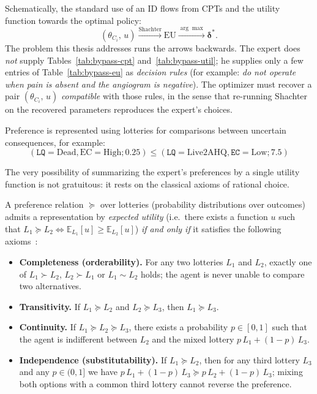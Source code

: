Schematically, the standard use of an ID flows from CPTs and the
utility function towards the optimal policy:
\[
  (\theta_{C_i},\, u) \xrightarrow{\text{Shachter}} \mathrm{EU}
  \xrightarrow{\arg\max} \boldsymbol{\delta}^{\!*}.
\]
The problem this
thesis addresses runs the arrows backwards. The expert does
\emph{not} supply Tables~\ref{tab:bypass-cpt}
and~\ref{tab:bypass-util}; he supplies only a few entries of
Table~\ref{tab:bypass-eu} as \emph{decision rules} (for example:\textit{ do not operate
when pain is absent and the angiogram is negative}). The optimizer
must recover a pair $(\theta_{C_i},\, u)$ \emph{compatible} with
those rules, in the sense that re-running Shachter on the recovered
parameters reproduces the expert's choices.

Preference is represented using lotteries for comparisons between uncertain consequences, for example:
\[
(\texttt{LQ} = \text{Dead}, \text{EC} = \text{High}; 0.25) \leq (\texttt{LQ} = \text{Live2AHQ}, \texttt{EC} = \text{Low}; 7.5)
\]

The very possibility of summarizing the expert's preferences by a
single utility function is not gratuitous: it rests on the classical
axioms of rational choice.



\begin{definition}
\label{def:vnm-axioms}
A preference relation $\succeq$ over lotteries (probability
distributions over outcomes) admits a representation by
\emph{expected utility} (i.e.\ there exists a function $u$ such that
$L_1 \succeq L_2 \iff \mathbb{E}_{L_1}[u] \ge \mathbb{E}_{L_2}[u]$)
\emph{if and only if} it satisfies the following
axioms~\cite{vonneumann1944theory}:
\begin{itemize}
  \item \textbf{Completeness (orderability).} For any two lotteries
        $L_1$ and $L_2$, exactly one of $L_1 \succ L_2$,
        $L_2 \succ L_1$ or $L_1 \sim L_2$ holds; the agent is never
        unable to compare two alternatives.
  \item \textbf{Transitivity.} If $L_1 \succeq L_2$ and
        $L_2 \succeq L_3$, then $L_1 \succeq L_3$.
  \item \textbf{Continuity.} If $L_1 \succeq L_2 \succeq L_3$, there
        exists a probability $p \in [0,1]$ such that the agent is
        indifferent between $L_2$ and the mixed lottery
        $p\,L_1 + (1-p)\,L_3$.
  \item \textbf{Independence (substitutability).} If
        $L_1 \succeq L_2$, then for any third lottery $L_3$ and any
        $p \in (0,1]$ we have
        $p\,L_1 + (1-p)\,L_3 \succeq p\,L_2 + (1-p)\,L_3$; mixing both
        options with a common third lottery cannot reverse the
        preference.
\end{itemize}
\end{definition}

